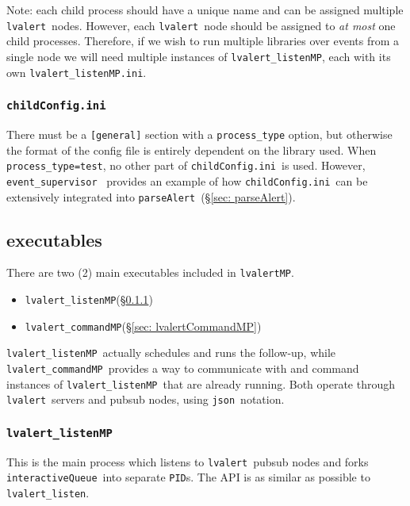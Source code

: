 \documentclass{article}
\newcommand{\PID}{\texttt{PID}}
\newcommand{\alert}{\texttt{lvalert}}
\newcommand{\lvalertListen}{\texttt{lvalert\_listen}}
\newcommand{\lvalertMP}{\texttt{lvalertMP}}
\newcommand{\lvalertListenMP}{\texttt{lvalert\_listenMP}}
\newcommand{\lvalertCommandMP}{\texttt{lvalert\_commandMP}}
\newcommand{\interactiveQueue}{\texttt{interactiveQueue}}
\newcommand{\parseAlert}{\texttt{parseAlert}}
\newcommand{\lvalertMPini}{\texttt{lvalert\_listenMP.ini}}
\newcommand{\childConfigini}{\texttt{childConfig.ini}}
\newcommand{\eventSupervisor}{\texttt{event\_supervisor}}
\newcommand{\json}{\texttt{json}}
\begin{document}
Note: each child process should have a unique name and can be assigned multiple \alert~nodes. 
However, each \alert~node should be assigned to \textit{at most} one child processes. 
Therefore, if we wish to run multiple libraries over events from a single node we will need multiple instances of \lvalertListenMP, each with its own \lvalertMPini.


\subsubsection{\childConfigini}
\label{sec: childConfigini}

There must be a \texttt{[general]} section with a \texttt{process\_type} option, but otherwise the format of the config file is entirely dependent on the library used.
When \texttt{process\_type=test}, no other part of \childConfigini~is used.
However, \eventSupervisor~\cite{eventSupervisor} provides an example of how \childConfigini~can be extensively integrated into \parseAlert~(\S\ref{sec: parseAlert}).


\subsection{executables}
\label{sec: executables}

There are two (2) main executables included in \lvalertMP.
\begin{itemize}
    \item{\lvalertListenMP (\S\ref{sec: lvalertListenMP})}
    \item{\lvalertCommandMP (\S\ref{sec: lvalertCommandMP})}
\end{itemize}
\lvalertListenMP~actually schedules and runs the follow-up, while \lvalertCommandMP~provides a way to communicate with and command instances of \lvalertListenMP~that are already running.
Both operate through \alert~servers and pubsub nodes, using \json~notation.


\subsubsection{\lvalertListenMP}
\label{sec: lvalertListenMP}

This is the main process which listens to \alert~pubsub nodes and forks \interactiveQueue~into separate {\PID}s. 
The API is as similar as possible to \lvalertListen.
\end{document}

